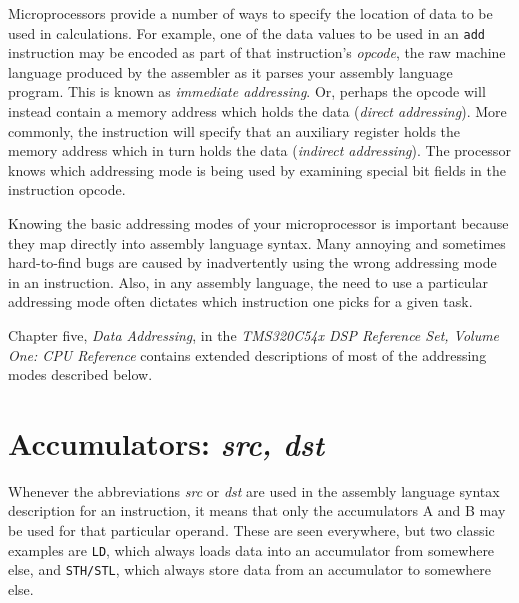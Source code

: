 \documentclass[11pt]{handout}
\begin{document}
\makeboxtitle
\vspace{0.3cm}

Microprocessors provide a number of ways to specify the location of data
to be used in calculations.  For example, one of the data values to be
used in an
{\tt add} instruction may be encoded as part of that
instruction's {\it opcode}, the raw machine language produced by the
assembler as it parses your assembly language program.  This is known as
{\it immediate addressing}.  Or, perhaps the opcode will instead contain
a memory address which holds the data ({\it direct addressing}).
More commonly, the instruction will specify that an auxiliary register
holds the memory address which in turn holds the data
({\it indirect addressing}).  The processor knows which addressing mode
is being used by examining special bit fields in the instruction opcode.

Knowing the basic addressing modes of your microprocessor is important
because they map directly into assembly language syntax.  Many annoying
and sometimes hard-to-find bugs are caused by inadvertently using the wrong
addressing mode in an instruction.
Also, in any assembly language, the need to use a
particular addressing mode often dictates which instruction one picks for
a given task.

Chapter five, {\it Data Addressing}, in the {\it TMS320C54x DSP Reference
Set, Volume One:  CPU Reference} contains extended descriptions of most
of the addressing modes described below.


\section{Accumulators: {\it src, dst}}

Whenever the abbreviations {\it src} or {\it dst} are used in the assembly
language syntax description for an instruction, it means that only the
accumulators A and B may be used for that particular operand.  These
are seen everywhere, but two classic examples are {\tt LD}, which always
loads data into an accumulator from somewhere else, and
{\tt STH/STL}, which always store data from an accumulator to somewhere
else.
\end{document}
